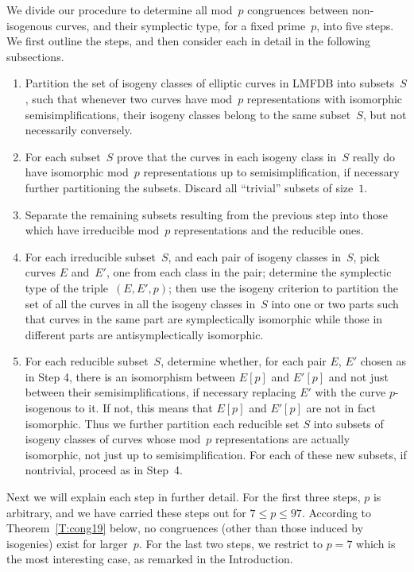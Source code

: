 \documentclass[12pt, reqno]{amsart}
\numberwithin{equation}{section}
\theoremstyle{definition}
\theoremstyle{remark}
\begin{document}
We divide our procedure to determine all mod~$p$ congruences between
non-isogenous curves, and their symplectic type, for a fixed
prime~$p$, into five steps.  We first outline the steps, and then
consider each in detail in the following subsections.
\begin{enumerate}[1.]
\item Partition the set of isogeny classes of elliptic curves in LMFDB
  into subsets~$S$, such that whenever two curves have mod~$p$
  representations with isomorphic semisimplifications, their isogeny
  classes belong to the same subset~$S$, but not necessarily
  conversely.
\item For each subset~$S$ prove that the curves in each isogeny class in~$S$ really
  do have isomorphic mod~$p$ representations up to
  semisimplification, if necessary further partitioning the subsets.
  Discard all ``trivial'' subsets of size~$1$.
\item Separate the remaining subsets resulting from the previous
  step into those which have irreducible mod~$p$ representations and
  the reducible ones.
\item For each irreducible subset~$S$, and each pair of isogeny
  classes in~$S$, pick curves $E$ and~$E'$, one from each class in the
  pair; determine the symplectic type of the triple~$(E,E',p)$; then
  use the isogeny criterion to partition the set of all the curves in
  all the isogeny classes in~$S$ into one or two parts such that curves
  in the same part are symplectically isomorphic while those in
  different parts are antisymplectically isomorphic.
\item For each reducible subset~$S$, determine whether, for each pair
  $E$, $E'$ chosen as in Step 4, there is an isomorphism between
  $E[p]$ and $E'[p]$ and not just between their semisimplifications,
  if necessary replacing $E'$ with the curve $p$-isogenous to it.  If
  not, this means that $E[p]$ and $E'[p]$ are not in fact isomorphic.
  Thus we further partition each reducible set $S$ into subsets of
  isogeny classes of curves whose mod~$p$ representations are actually
  isomorphic, not just up to semisimplification.  For each of these
  new subsets, if nontrivial, proceed as in Step~4.

\end{enumerate}
Next we will explain each step in further detail.  For the first three
steps, $p$ is arbitrary, and we have carried these steps out for $7\le
p\le97$.  According to Theorem~\ref{T:cong19} below, no congruences
(other than those induced by isogenies) exist for larger~$p$.  For the
last two steps, we restrict to $p=7$ which is the most interesting
case, as remarked in the Introduction.
\end{document}
